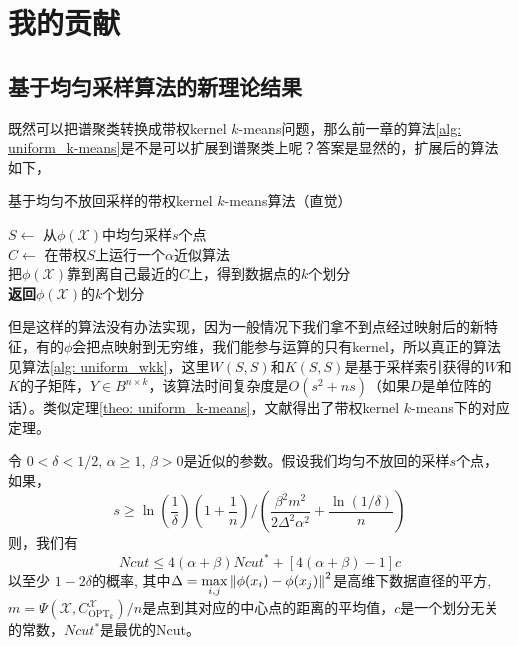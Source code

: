 \section{我的贡献}

\subsection{基于均匀采样算法的新理论结果}
既然可以把谱聚类转换成带权kernel $k$-means问题，那么前一章的算法\ref{alg: uniform_k-means}是不是可以扩展到谱聚类上呢？答案是显然的，扩展后的算法如下，
\begin{algorithm}
    \caption{基于均匀不放回采样的带权kernel $k$-means算法（直觉）}
    $S \gets$ 从$\phi(\mathcal{X})$中均匀采样$s$个点\\
    $C \gets$ 在带权$S$上运行一个$\alpha$近似算法\\
    把$\phi(\mathcal{X})$靠到离自己最近的$C$上，得到数据点的$k$个划分\\
    \textbf{返回}$\phi(\mathcal{X})$的$k$个划分
\end{algorithm}
但是这样的算法没有办法实现，因为一般情况下我们拿不到点经过映射后的新特征，有的$\phi$会把点映射到无穷维，我们能参与运算的只有kernel，所以真正的算法见算法\ref{alg: uniform_wkk}，这里$W(S,S)$和$K(S,S)$是基于采样索引获得的$W$和$K$的子矩阵，$Y\in B^{n\times k}$，该算法时间复杂度是$O(s^2+ns)$（如果$D$是单位阵的话）。类似定理\ref{theo: uniform_k-means}，文献\cite{Mohan:2017:BNA:3172077.3172235}得出了带权kernel $k$-means下的对应定理。
\begin{theorem}[均匀不放回采样的谱聚类解的质量]
    \label{theo: uniform_wkk}
    令 $0 < \delta <1/2$, $\alpha \geq 1$, $\beta >0$是近似的参数。假设我们均匀不放回的采样$s$个点，如果，
    \begin{equation}
    s \geq \ln(\frac{1}{\delta})(1+\frac{1}{n})/(\frac{\beta^2 m^2}{2\Delta^2 \alpha^2}+\frac{\ln(1/\delta)}{n})
    \end{equation}
    则，我们有
    \begin{equation}
    Ncut \leq 4(\alpha + \beta) Ncut^* + [4(\alpha + \beta)-1]c
    \end{equation}
    以至少 $1-2\delta$的概率, 其中$\Delta = \max\limits_{i,j}\left\lVert\phi(x_i) - \phi(x_j)\right\rVert^2$是高维下数据直径的平方, $m = \Psi(\mathcal{X},C_{\text{OPT}_k}^{\mathcal{X}})/n$是点到其对应的中心点的距离的平均值，$c$是一个划分无关的常数，$Ncut^*$是最优的Ncut。
\end{theorem}
